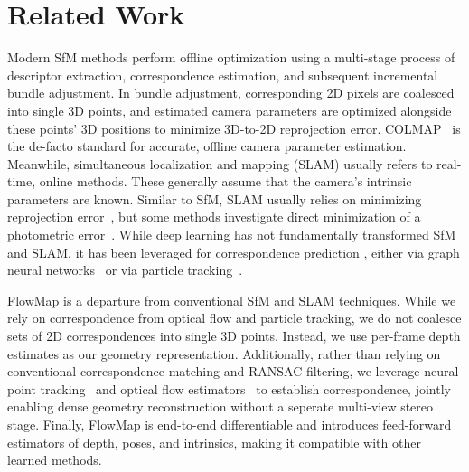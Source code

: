 \section{Related Work}
\label{sec:related}

Modern SfM methods perform offline optimization using a multi-stage process of descriptor extraction, correspondence estimation, and subsequent incremental bundle adjustment.
In bundle adjustment, corresponding 2D pixels are coalesced into single 3D points, and estimated camera parameters are optimized alongside these points' 3D positions to minimize 3D-to-2D reprojection error.
COLMAP~\cite{schonberger2016structure} is the de-facto standard for accurate, offline camera parameter estimation.
Meanwhile, simultaneous localization and mapping (SLAM) usually refers to real-time, online methods. These generally assume that the camera's intrinsic parameters are known.
Similar to SfM, SLAM usually relies on minimizing reprojection error~\cite{mur2015orb,mur2017orb,campos_orb3,rosinol2020kimera}, but some methods investigate direct minimization of a photometric error~\cite{engel2014lsd,engel2017direct}.
While deep learning has not fundamentally transformed SfM and SLAM, it has been leveraged for correspondence prediction \cite{choy2016universal,mishchuk2017working,luo2018geodesc,ono2018lf}, either via graph neural networks~\cite{sarlin2020superglue} or via particle tracking~\cite{zhao2022particlesfm, harley2022particle, doersch2023tapir}.

FlowMap is a departure from conventional SfM and SLAM techniques.
While we rely on correspondence from optical flow and particle tracking, we do not coalesce sets of 2D correspondences into single 3D points.
Instead, we use per-frame depth estimates as our geometry representation.
Additionally, rather than relying on conventional correspondence matching and RANSAC filtering, we leverage neural point tracking~\cite{karaev2023cotracker} and optical flow estimators~\cite{raft} to establish correspondence, jointly enabling dense geometry reconstruction without a seperate multi-view stereo stage.
Finally, FlowMap is end-to-end differentiable and introduces feed-forward estimators of depth, poses, and intrinsics, making it compatible with other learned methods.

